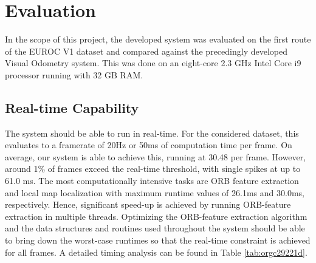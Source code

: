 \documentclass[a4paper, 10pt]{article}
\begin{document}
\section{Evaluation}
\label{sec:orgbfee33d}
In the scope of this project, the developed system was evaluated on the first route of the EUROC V1 dataset \cite{euroc} and compared against the precedingly developed Visual Odometry system.
This was done on an eight-core 2.3 GHz Intel Core i9 processor running with 32 GB RAM.

\subsection{Real-time Capability}
\label{sec:org5dffd49}
The system should be able to run in real-time. For the considered dataset, this evaluates to a framerate of 20Hz or 50ms of computation time per frame. 
On average, our system is able to achieve this, running at 30.48 per frame. However, around 1\% of frames exceed the real-time threshold, with single spikes at up to 61.0 ms.
The most computationally intensive tasks are ORB feature extraction and local map localization with maximum runtime values of 26.1ms and 30.0ms, respectively.
Hence, significant speed-up is achieved by running ORB-feature extraction in multiple threads.
Optimizing the ORB-feature extraction algorithm and the data structures and routines used throughout the system should be able to bring down the worst-case 
runtimes so that the real-time constraint is achieved for all frames.
A detailed timing analysis can be found in Table \ref{tab:orgc29221d}. 
\end{document}
